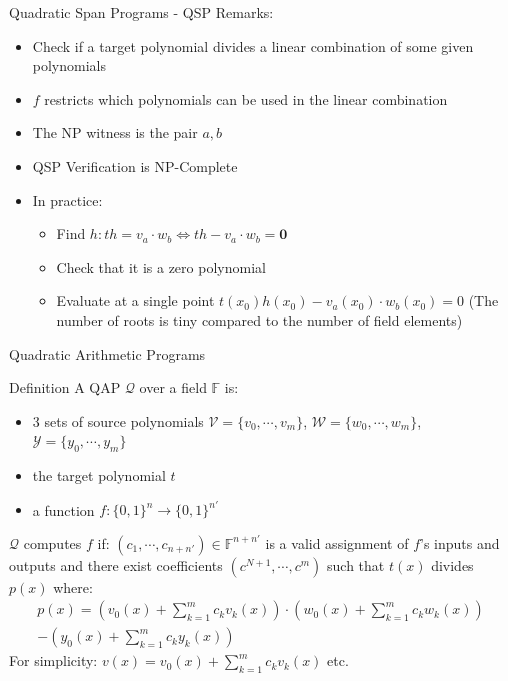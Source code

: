 \documentclass[handout]{beamer}
\begin{document}
\begin{frame}[allowframebreaks]{Quadratic Span Programs - QSP}
Remarks: 

\begin{itemize}
    \item Check if a target polynomial divides a linear combination of some given polynomials  
    \item $f$ restricts which polynomials can be used in the linear combination  
    \item The NP witness is the pair $a,b$  
    \item QSP Verification is NP-Complete  
    \item In practice:
    \begin{itemize}
        \item Find $h: th = v_a \cdot w_b \Leftrightarrow th - v_a \cdot w_b = \textbf{0}$       
        \item Check that it is a zero polynomial  
        \item Evaluate at a single point $t(x_0)h(x_0) - v_a(x_0) \cdot w_b(x_0) = 0$ (The number of roots is tiny compared to the number of field elements)
     \end{itemize}
\end{itemize} 
\end{frame}

\begin{frame}[allowframebreaks]{Quadratic Arithmetic Programs}
\begin{block}{Definition}
A QAP $\mathcal{Q}$ over a field $\mathbb{F}$ is:  
\begin{itemize}
    \item 3 sets of source polynomials $\mathcal{V} = \{v_0, \cdots, v_m \}$, $\mathcal{W} = \{ w_0, \cdots, w_m \}$, $\mathcal{Y}  = \{y_0, \cdots, y_m \}$  
    \item the target polynomial $t$  
    \item a function $f : \{0,1\}^n \rightarrow \{0,1\}^{n'}$
\end{itemize}
\end{block}

\framebreak

$\mathcal{Q}$ computes $f$ if:  
 $ (c_1, \cdots ,c_{n+n'}) \in \mathbb{F}^{n+n'}$ is a valid assignment of
$f$’s inputs and outputs and there exist coefficients $(c^{N+1},\cdots,c^m)$ such that $t(x)$ divides $p(x)$ where:
\begin{align*}
p(x) = (v_0(x)+\sum_{k=1}^m c_k v_k(x)) \cdot (w_0(x)+  \sum_{k=1}^m c_k w_k(x))\\ - (y_0(x)+\sum_{k=1}^m c_k y_k(x))
\end{align*}
For simplicity: $v(x)= v_0(x)+\sum_{k=1}^m c_k v_k(x)$ etc.
\end{frame}
\end{document}
